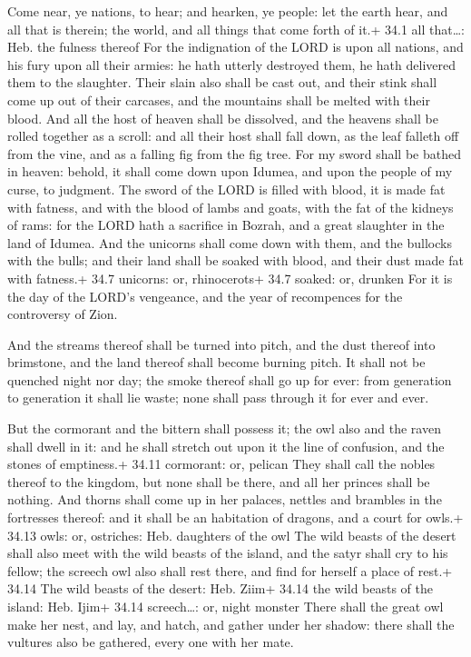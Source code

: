  Come near, ye nations, to hear; and hearken, ye people: let
the earth hear, and all that is therein; the world, and all things that
come forth of it.+ 34.1 all that\ldots: Heb. the fulness thereof
 For the indignation of the LORD is upon all nations, and
his fury upon all their armies: he hath utterly destroyed them, he hath
delivered them to the slaughter.  Their slain also shall be
cast out, and their stink shall come up out of their carcases, and the
mountains shall be melted with their blood.  And all the
host of heaven shall be dissolved, and the heavens shall be rolled
together as a scroll: and all their host shall fall down, as the leaf
falleth off from the vine, and as a falling fig from the fig tree.
 For my sword shall be bathed in heaven: behold, it shall
come down upon Idumea, and upon the people of my curse, to judgment.
 The sword of the LORD is filled with blood, it is made fat
with fatness, and with the blood of lambs and goats, with the fat of the
kidneys of rams: for the LORD hath a sacrifice in Bozrah, and a great
slaughter in the land of Idumea.  And the unicorns shall
come down with them, and the bullocks with the bulls; and their land
shall be soaked with blood, and their dust made fat with fatness.+ 34.7
unicorns: or, rhinocerots+ 34.7 soaked: or, drunken  For it
is the day of the LORD's vengeance, and the year of recompences for the
controversy of Zion.

 And the streams thereof shall be turned into pitch, and the
dust thereof into brimstone, and the land thereof shall become burning
pitch.  It shall not be quenched night nor day; the smoke
thereof shall go up for ever: from generation to generation it shall lie
waste; none shall pass through it for ever and ever.

 But the cormorant and the bittern shall possess it; the
owl also and the raven shall dwell in it: and he shall stretch out upon
it the line of confusion, and the stones of emptiness.+ 34.11 cormorant:
or, pelican  They shall call the nobles thereof to the
kingdom, but none shall be there, and all her princes shall be nothing.
 And thorns shall come up in her palaces, nettles and
brambles in the fortresses thereof: and it shall be an habitation of
dragons, and a court for owls.+ 34.13 owls: or, ostriches: Heb.
daughters of the owl  The wild beasts of the desert shall
also meet with the wild beasts of the island, and the satyr shall cry to
his fellow; the screech owl also shall rest there, and find for herself
a place of rest.+ 34.14 The wild beasts of the desert: Heb. Ziim+ 34.14
the wild beasts of the island: Heb. Ijim+ 34.14 screech\ldots: or, night
monster  There shall the great owl make her nest, and lay,
and hatch, and gather under her shadow: there shall the vultures also be
gathered, every one with her mate.

